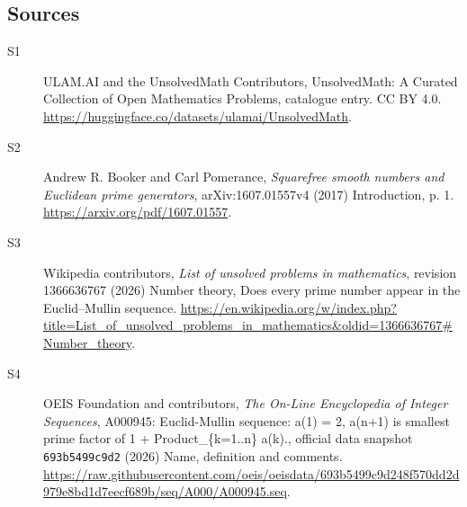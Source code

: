 \documentclass[11pt]{article}
\begin{document}
\subsection{Sources}
\begin{description}
\item[\hypertarget{source:statement:1}{S1}] ULAM.AI and the UnsolvedMath Contributors, UnsolvedMath: A Curated Collection of Open Mathematics Problems, catalogue entry. CC BY 4.0. \url{https://huggingface.co/datasets/ulamai/UnsolvedMath}.
\item[\hypertarget{source:statement:2}{S2}] Andrew R. Booker and Carl Pomerance, \emph{Squarefree smooth numbers and Euclidean prime generators}, arXiv:1607.01557v4 (2017) Introduction, p. 1. \url{https://arxiv.org/pdf/1607.01557}.
\item[\hypertarget{source:statement:3}{S3}] Wikipedia contributors, \emph{List of unsolved problems in mathematics}, revision 1366636767 (2026) Number theory, Does every prime number appear in the Euclid–Mullin sequence. \url{https://en.wikipedia.org/w/index.php?title=List_of_unsolved_problems_in_mathematics&oldid=1366636767#Number_theory}.
\item[\hypertarget{source:statement:4}{S4}] OEIS Foundation and contributors, \emph{The On-Line Encyclopedia of Integer Sequences}, A000945: Euclid-Mullin sequence: a(1) = 2, a(n+1) is smallest prime factor of 1 + Product\_\{k=1..n\} a(k)., official data snapshot \texttt{693b5499c9d2} (2026) Name, definition and comments. \url{https://raw.githubusercontent.com/oeis/oeisdata/693b5499c9d248f570dd2d979e8bd1d7eecf689b/seq/A000/A000945.seq}.
\end{description}
\label{end:statement}
\end{document}
